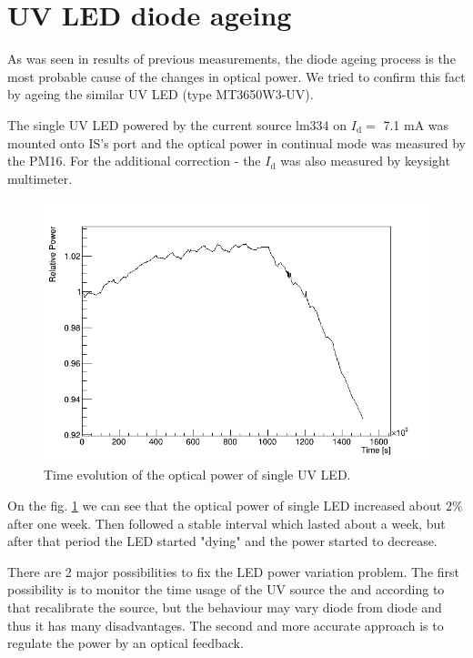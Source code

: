 \section{UV LED diode ageing}
As was seen in results of previous measurements, the diode ageing process is the most probable cause of the changes in optical power. We tried to confirm this fact by ageing the similar UV LED (type MT3650W3-UV).
\par
The single UV LED powered by the current source lm334 on $I_\textrm{d} =$ 7.1 mA was mounted onto IS's port and the optical power in continual mode was measured by the PM16. For the additional correction - the $I_\textrm{d} $ was also measured by keysight multimeter.


\par
\begin{figure}[H]
 \centering
 \includegraphics[scale=0.5]{./pictures/corrected1}
 \caption{Time evolution of the optical power of single UV LED.}
 \label{SingleDiod}
\end{figure}
\par
On the fig. \ref{SingleDiod} we can see that the optical power of single LED increased about $2 \%$ after one week. Then followed a stable interval which lasted about a week, but after that period the LED started "dying" and the power started to decrease.

\par
There are 2 major possibilities to fix the LED power variation problem. The first possibility is to monitor the time usage of the UV source the and according to that recalibrate the source, but the behaviour may vary diode from diode and thus it has many disadvantages. The second and more accurate approach is to regulate the power by an optical feedback.    


